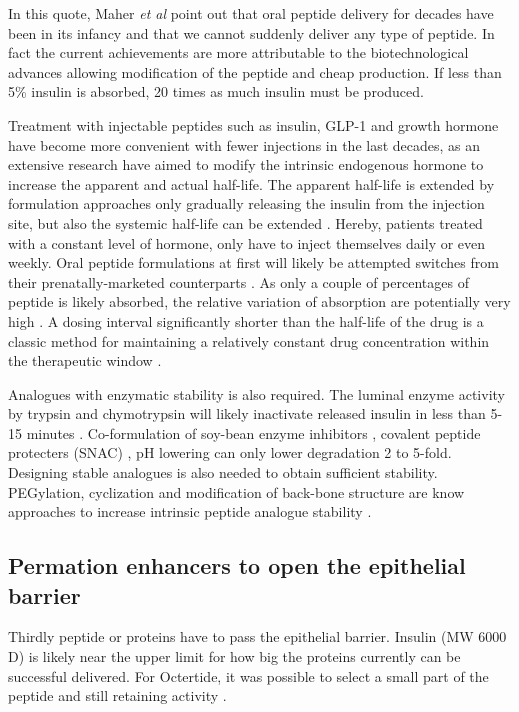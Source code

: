 In this quote, Maher \textit{et al} point out that oral peptide delivery for decades have been in its infancy and that we cannot suddenly deliver any type of peptide. In fact the current achievements are more attributable to the biotechnological advances allowing modification of the peptide and cheap production. If less than 5\% insulin is absorbed, 20 times as much insulin must be produced.

Treatment with injectable peptides such as insulin, GLP-1 and growth hormone have become more convenient with fewer injections in the last decades, as an extensive research have aimed to modify the intrinsic endogenous hormone to increase the apparent and actual half-life. The apparent half-life is extended by formulation approaches only gradually releasing the insulin from the injection site, but also the systemic half-life can be extended \cite{arnolds2010pharmacokinetic}. Hereby, patients treated with a constant level of hormone, only have to inject themselves daily or even weekly. Oral peptide formulations at first will likely be attempted switches from their prenatally-marketed counterparts \cite{maher2014formulation}. As only a couple of percentages of peptide is likely absorbed, the relative variation of absorption are potentially very high \cite{gabor2010improving}. A dosing interval significantly shorter than the half-life of the drug is a classic method for maintaining a relatively constant drug concentration within the therapeutic window \cite{tozer2006introduction}.

Analogues with enzymatic stability is also required. The luminal enzyme activity by trypsin and chymotrypsin will likely inactivate released insulin in less than 5-15 minutes \cite{welling2014citric}. Co-formulation of soy-bean enzyme inhibitors \cite{fujii1985promoting}, covalent peptide protecters (SNAC) \cite{bruno2013basics}, pH lowering \cite{welling2014citric} can only lower degradation 2 to 5-fold. Designing stable analogues is also needed to obtain sufficient stability. PEGylation, cyclization and modification of back-bone structure are know approaches to increase intrinsic peptide analogue stability \cite{bruno2013basics}.

\subsection{Permation enhancers to open the epithelial barrier}
Thirdly peptide or proteins have to pass the epithelial barrier. Insulin (MW 6000 D) is likely near the upper limit for how big the proteins currently can be successful delivered. For Octertide, it was possible to select a small part of the peptide and still retaining activity \cite{aguiree2013idf}. 

